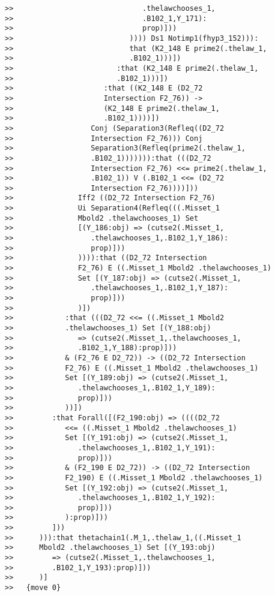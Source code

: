 \documentclass[12pt]{article}
\begin{document}
\begin{verbatim}
>>                              .thelawchooses_1,
>>                              .B102_1,Y_171):
>>                              prop)]))
>>                           )))) Ds1 Notimp1(fhyp3_152))):
>>                           that (K2_148 E prime2(.thelaw_1,
>>                           .B102_1)))])
>>                        :that (K2_148 E prime2(.thelaw_1,
>>                        .B102_1)))])
>>                     :that ((K2_148 E (D2_72
>>                     Intersection F2_76)) ->
>>                     (K2_148 E prime2(.thelaw_1,
>>                     .B102_1))))])
>>                  Conj (Separation3(Refleq((D2_72
>>                  Intersection F2_76))) Conj
>>                  Separation3(Refleq(prime2(.thelaw_1,
>>                  .B102_1))))))):that (((D2_72
>>                  Intersection F2_76) <<= prime2(.thelaw_1,
>>                  .B102_1)) V (.B102_1 <<= (D2_72
>>                  Intersection F2_76))))]))
>>               Iff2 ((D2_72 Intersection F2_76)
>>               Ui Separation4(Refleq(((.Misset_1
>>               Mbold2 .thelawchooses_1) Set
>>               [(Y_186:obj) => (cutse2(.Misset_1,
>>                  .thelawchooses_1,.B102_1,Y_186):
>>                  prop)]))
>>               )))):that ((D2_72 Intersection
>>               F2_76) E ((.Misset_1 Mbold2 .thelawchooses_1)
>>               Set [(Y_187:obj) => (cutse2(.Misset_1,
>>                  .thelawchooses_1,.B102_1,Y_187):
>>                  prop)]))
>>               )])
>>            :that (((D2_72 <<= ((.Misset_1 Mbold2
>>            .thelawchooses_1) Set [(Y_188:obj)
>>               => (cutse2(.Misset_1,.thelawchooses_1,
>>               .B102_1,Y_188):prop)]))
>>            & (F2_76 E D2_72)) -> ((D2_72 Intersection
>>            F2_76) E ((.Misset_1 Mbold2 .thelawchooses_1)
>>            Set [(Y_189:obj) => (cutse2(.Misset_1,
>>               .thelawchooses_1,.B102_1,Y_189):
>>               prop)]))
>>            ))])
>>         :that Forall([(F2_190:obj) => ((((D2_72
>>            <<= ((.Misset_1 Mbold2 .thelawchooses_1)
>>            Set [(Y_191:obj) => (cutse2(.Misset_1,
>>               .thelawchooses_1,.B102_1,Y_191):
>>               prop)]))
>>            & (F2_190 E D2_72)) -> ((D2_72 Intersection
>>            F2_190) E ((.Misset_1 Mbold2 .thelawchooses_1)
>>            Set [(Y_192:obj) => (cutse2(.Misset_1,
>>               .thelawchooses_1,.B102_1,Y_192):
>>               prop)]))
>>            ):prop)]))
>>         ]))
>>      ))):that thetachain1(.M_1,.thelaw_1,((.Misset_1
>>      Mbold2 .thelawchooses_1) Set [(Y_193:obj)
>>         => (cutse2(.Misset_1,.thelawchooses_1,
>>         .B102_1,Y_193):prop)]))
>>      )]
>>   {move 0}




\end{verbatim}
\end{document}
